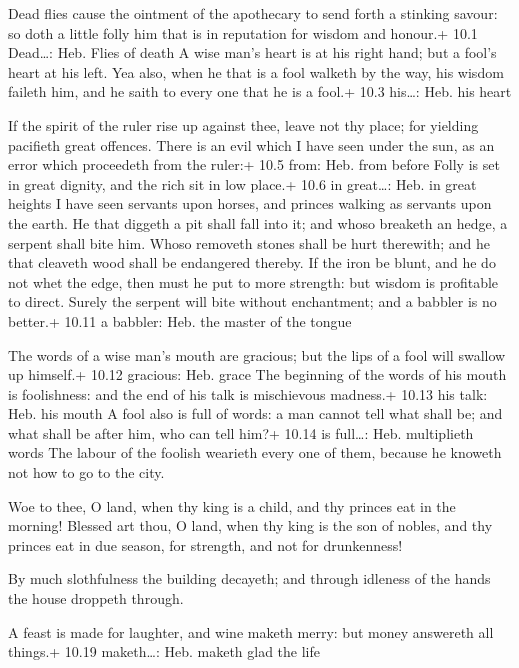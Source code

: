  Dead flies cause the ointment of the apothecary to send
forth a stinking savour: so doth a little folly him that is in
reputation for wisdom and honour.+ 10.1 Dead\ldots: Heb. Flies of death
 A wise man's heart is at his right hand; but a fool's heart
at his left.  Yea also, when he that is a fool walketh by
the way, his wisdom faileth him, and he saith to every one that he is a
fool.+ 10.3 his\ldots: Heb. his heart

 If the spirit of the ruler rise up against thee, leave not
thy place; for yielding pacifieth great offences.  There is
an evil which I have seen under the sun, as an error which proceedeth
from the ruler:+ 10.5 from: Heb. from before  Folly is set
in great dignity, and the rich sit in low place.+ 10.6 in great\ldots:
Heb. in great heights  I have seen servants upon horses, and
princes walking as servants upon the earth.  He that diggeth
a pit shall fall into it; and whoso breaketh an hedge, a serpent shall
bite him.  Whoso removeth stones shall be hurt therewith;
and he that cleaveth wood shall be endangered thereby.  If
the iron be blunt, and he do not whet the edge, then must he put to more
strength: but wisdom is profitable to direct.  Surely the
serpent will bite without enchantment; and a babbler is no better.+
10.11 a babbler: Heb. the master of the tongue

 The words of a wise man's mouth are gracious; but the lips
of a fool will swallow up himself.+ 10.12 gracious: Heb. grace
 The beginning of the words of his mouth is foolishness:
and the end of his talk is mischievous madness.+ 10.13 his talk: Heb.
his mouth  A fool also is full of words: a man cannot tell
what shall be; and what shall be after him, who can tell him?+ 10.14 is
full\ldots: Heb. multiplieth words  The labour of the
foolish wearieth every one of them, because he knoweth not how to go to
the city.

 Woe to thee, O land, when thy king is a child, and thy
princes eat in the morning!  Blessed art thou, O land, when
thy king is the son of nobles, and thy princes eat in due season, for
strength, and not for drunkenness!

 By much slothfulness the building decayeth; and through
idleness of the hands the house droppeth through.

 A feast is made for laughter, and wine maketh merry: but
money answereth all things.+ 10.19 maketh\ldots: Heb. maketh glad the
life

